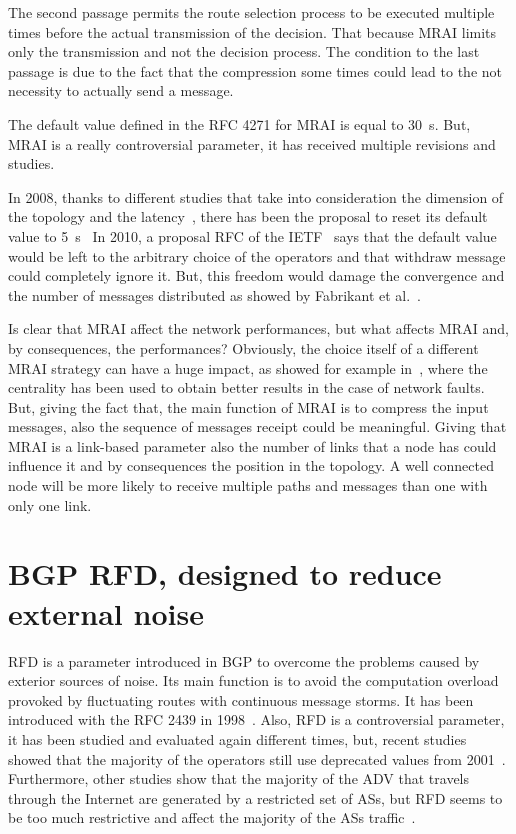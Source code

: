 The second passage permits the route selection process to be executed multiple
times before the actual transmission of the decision.
That because \ac{MRAI} limits only the transmission and not the decision process.
The condition to the last passage is due to the fact that the compression some
times could lead to the not necessity to actually send a message.

The default value defined in the \ac{RFC} \num{4271} for \ac{MRAI} is equal to
\SI{30}{\second}.
But, \ac{MRAI} is a really controversial parameter, it has received multiple
revisions and studies.

In \num{2008}, thanks to different studies that take into consideration the
dimension of the topology and the latency~\cite{qiu2005optimal}, there has been
the proposal to reset its default value to \SI{5}{\second}~\cite{jakma2008revised}
In \num{2010}, a proposal \ac{RFC} of the \ac{IETF}~\cite{jakma2010revisions}
says that the default value would be left to the arbitrary choice of the operators and
that withdraw message could completely ignore it.
But, this freedom would damage the convergence and the number of messages distributed
as showed by Fabrikant et al.~\cite{fabrikant2011there}.

Is clear that \ac{MRAI} affect the network performances, but what affects \ac{MRAI}
and, by consequences, the performances?
Obviously, the choice itself of a different \ac{MRAI} strategy can have a huge
impact, as showed for example in~\cite{milani2019BGP}, where the centrality
has been used to obtain better results in the case of network faults.
But, giving the fact that, the main function of \ac{MRAI} is to compress the
input messages, also the sequence of messages receipt could be meaningful.
Giving that \ac{MRAI} is a link-based parameter also the number of links that
a node has could influence it and by consequences the position in the topology.
A well connected node will be more likely to receive multiple paths and messages
than one with only one link.

\section{BGP RFD, designed to reduce external noise}
\label{sec:bgp_rfd}

\ac{RFD} is a parameter introduced in \ac{BGP} to overcome the problems caused
by exterior sources of noise.
Its main function is to avoid the computation overload provoked by fluctuating
routes with continuous message storms.
It has been introduced with the \ac{RFC} \num{2439} in \num{1998}~\cite{rfc2439}.
Also, \ac{RFD} is a controversial parameter, it has been studied and evaluated again
different times, but, recent studies showed that the majority of the operators
still use deprecated values from \num{2001}~\cite{gray2020bgp}.
Furthermore, other studies show that the majority of the \ac{ADV} that travels
through the Internet are generated by a restricted set of \acp{AS}, but \ac{RFD}
seems to be too much restrictive and affect the majority of the \acp{AS} traffic~\cite{pelsser2011route}.


